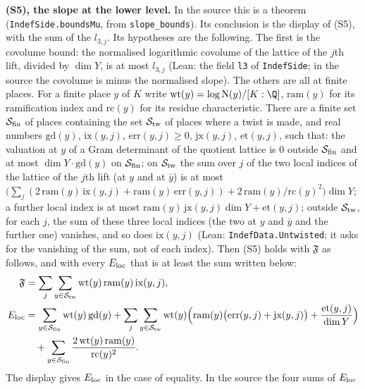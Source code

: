 \documentclass[11pt,letterpaper]{article}
\begin{document}
\textbf{(S5), the slope at the lower level.} In the source this is a theorem
(\texttt{IndefSide.boundsMu}, from \texttt{slope\_bounds}). Its conclusion is the display of (S5), with
the sum of the $l_{3,j}$. Its hypotheses are the following. The first is the covolume bound: the
normalised logarithmic covolume of the lattice of the $j$th lift, divided by $\dim Y$, is at most
$l_{3,j}$ (Lean: the field \texttt{l3} of \texttt{IndefSide}; in the source the covolume is minus the
normalised slope). The others are all at finite places. For a finite place $y$ of $K$ write
$\mathrm{wt}(y)=\log\mathrm N(y)/[K:\Q]$, $\mathrm{ram}(y)$ for its ramification index and
$\mathrm{rc}(y)$ for its residue characteristic. There are a finite set $\mathcal S_{\rm fin}$ of places
containing the set $\mathcal S_{\rm tw}$ of places where a twist is made, and real numbers
$\mathrm{gd}(y)$, $\mathrm{ix}(y,j)$, $\mathrm{err}(y,j)\ge0$, $\mathrm{jx}(y,j)$, $\mathrm{et}(y,j)$,
such that: the valuation at $y$ of a Gram determinant of the quotient lattice is $0$ outside
$\mathcal S_{\rm fin}$ and at most $\dim Y\cdot\mathrm{gd}(y)$ on $\mathcal S_{\rm fin}$; on
$\mathcal S_{\rm tw}$ the sum over $j$ of the two local indices of the lattice of the $j$th lift (at $y$
and at $\bar y$) is at most
$\big(\sum_j(2\,\mathrm{ram}(y)\,\mathrm{ix}(y,j)+\mathrm{ram}(y)\,\mathrm{err}(y,j))
+2\,\mathrm{ram}(y)/\mathrm{rc}(y)^2\big)\dim Y$; a further local index is at most
$\mathrm{ram}(y)\,\mathrm{jx}(y,j)\dim Y+\mathrm{et}(y,j)$; outside $\mathcal S_{\rm tw}$, for each $j$, the
sum of these three local indices (the two at $y$ and $\bar y$ and the further one) vanishes, and so does
$\mathrm{ix}(y,j)$ (Lean: \texttt{IndefData.Untwisted}; it asks for the vanishing of the sum, not of each
index). Then (S5) holds with $\mathfrak F$ as follows, and with every $E_{\rm loc}$ that is at least
the sum written below:
\begin{align}\label{D:294}
 \mathfrak F&=\sum_j\sum_{y\in\mathcal S_{\rm tw}}\mathrm{wt}(y)\,\mathrm{ram}(y)\,\mathrm{ix}(y,j),\\
 E_{\rm loc}&=\sum_{y\in\mathcal S_{\rm fin}}\mathrm{wt}(y)\,\mathrm{gd}(y)
 +\sum_j\sum_{y\in\mathcal S_{\rm tw}}\mathrm{wt}(y)\Big(\mathrm{ram}(y)\big(\mathrm{err}(y,j)+\mathrm{jx}(y,j)\big)
 +\frac{\mathrm{et}(y,j)}{\dim Y}\Big)\\
 &\quad+\sum_{y\in\mathcal S_{\rm fin}}\frac{2\,\mathrm{wt}(y)\,\mathrm{ram}(y)}{\mathrm{rc}(y)^2}.
\end{align}
The display gives $E_{\rm loc}$ in the case of equality. In the source the four sums of $E_{\rm loc}$
\end{document}

